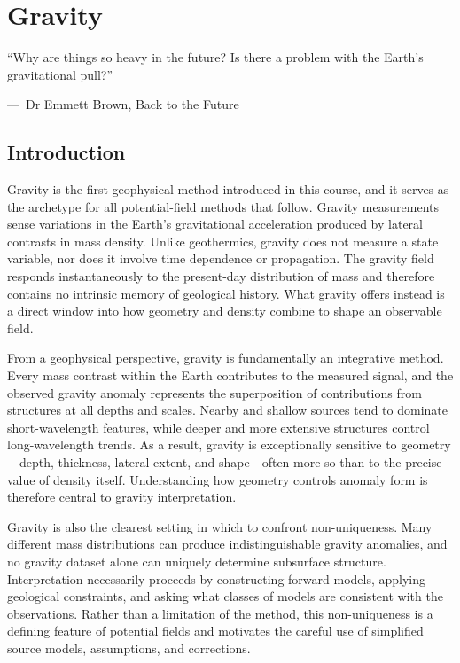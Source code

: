 \chapter{Gravity}\label{ch:gravity}

\epigraph{ ``Why are things so heavy in the future?  Is there a problem with the Earth's gravitational pull?''}
{{\normalfont ---\ Dr Emmett Brown}, Back to the Future}

\section{Introduction}

Gravity is the first geophysical method introduced in this course, and it serves as the archetype for all potential-field methods that follow. Gravity measurements sense variations in the Earth's gravitational acceleration produced by lateral contrasts in mass density. Unlike geothermics, gravity does not measure a state variable, nor does it involve time dependence or propagation. The gravity field responds instantaneously to the present-day distribution of mass and therefore contains no intrinsic memory of geological history. What gravity offers instead is a direct window into how geometry and density combine to shape an observable field.

From a geophysical perspective, gravity is fundamentally an integrative method. Every mass contrast within the Earth contributes to the measured signal, and the observed gravity anomaly represents the superposition of contributions from structures at all depths and scales. Nearby and shallow sources tend to dominate short-wavelength features, while deeper and more extensive structures control long-wavelength trends. As a result, gravity is exceptionally sensitive to geometry—depth, thickness, lateral extent, and shape—often more so than to the precise value of density itself. Understanding how geometry controls anomaly form is therefore central to gravity interpretation.

Gravity is also the clearest setting in which to confront non-uniqueness. Many different mass distributions can produce indistinguishable gravity anomalies, and no gravity dataset alone can uniquely determine subsurface structure. Interpretation necessarily proceeds by constructing forward models, applying geological constraints, and asking what classes of models are consistent with the observations. Rather than a limitation of the method, this non-uniqueness is a defining feature of potential fields and motivates the careful use of simplified source models, assumptions, and corrections.

